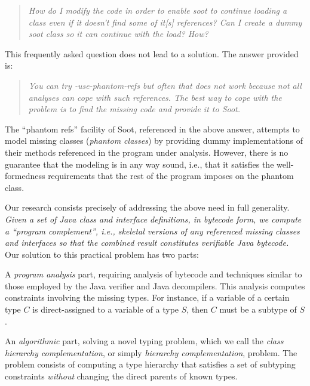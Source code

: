 \vspace{-1mm}
\begin{quote}
\emph{How do I modify the code in
order to enable soot to continue loading a class even if it doesn't
find some of it[s] references? Can I create a dummy soot class so it can
continue with the load? How?}
\end{quote}

\noindent This frequently asked question does not lead to a solution. The answer
provided is:
\begin{quote}
\emph{You can try -use-phantom-refs but often that
does not work because not all analyses can cope with such
references. The best way to cope with the problem is to find the
missing code and provide it to Soot.}
\end{quote}

The ``phantom refs'' facility of Soot, referenced in the above answer,
attempts to model missing classes (\emph{phantom classes}) by
providing dummy implementations of their methods referenced in the
program under analysis. However, there is no guarantee that the
modeling is in any way sound, i.e., that it satisfies the well-formedness
requirements that the rest of the program imposes on the phantom
class.

Our research consists precisely of addressing the above need in full
generality. \emph{Given a set of Java class and interface definitions,
in bytecode form, we compute a ``program complement'', i.e., skeletal
versions of any referenced missing classes and interfaces so that the
combined result constitutes verifiable Java bytecode.} Our solution to
this practical problem has two parts:

\begin{asparaitem}[$\cdot$]
\item A \emph{program analysis} part, requiring analysis of bytecode and techniques
similar to those employed by the Java verifier and Java
decompilers. This analysis computes constraints involving the missing
types. For instance, if a variable of a certain type $C$ is
direct-assigned to a variable of a type $S$, then $C$ must be a subtype of
$S$.

\item An \emph{algorithmic} part, solving a novel typing problem, which we call
  the \emph{class hierarchy complementation}, or
  simply \emph{hierarchy complementation}, problem. The problem
  consists of computing a type hierarchy that satisfies a set of
  subtyping constraints \emph{without} changing the direct parents of
  known types.
\end{asparaitem}


